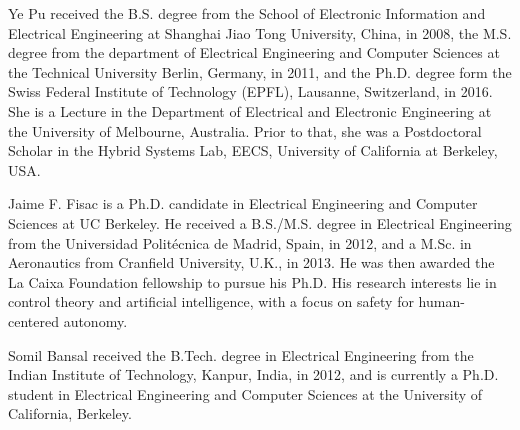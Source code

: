 \documentclass[journal]{IEEEtran}
\begin{document}
\begin{IEEEbiography}{Ye Pu}
	received the B.S. degree from the School of Electronic Information and Electrical Engineering at Shanghai Jiao Tong University, China, in 2008, the M.S. degree from the department of Electrical Engineering and Computer Sciences at the Technical University Berlin, Germany, in 2011, and the Ph.D. degree form the Swiss Federal Institute of Technology (EPFL), Lausanne, Switzerland, in 2016. She is a Lecture in the Department of Electrical and Electronic Engineering at the University of Melbourne, Australia. Prior to that, she was a Postdoctoral Scholar in the Hybrid Systems Lab, EECS, University of California at Berkeley, USA.\vspace{-2cm}
\end{IEEEbiography}
\begin{IEEEbiography}{Jaime F. Fisac}
	is a Ph.D. candidate in Electrical Engineering and Computer Sciences at UC Berkeley. He received a B.S./M.S. degree in Electrical Engineering from the Universidad Politécnica de Madrid, Spain, in 2012, and a M.Sc. in Aeronautics from Cranfield University, U.K., in 2013. He was then awarded the La Caixa Foundation fellowship to pursue his Ph.D. His research interests lie in control theory and artificial intelligence, with a focus on safety for human-centered autonomy.\vspace{-2cm}
\end{IEEEbiography}
\begin{IEEEbiography}{Somil Bansal}
	received the B.Tech. degree in Electrical Engineering from the Indian Institute of Technology, Kanpur, India, in 2012, and is currently a Ph.D. student in Electrical Engineering and Computer Sciences at the University of California, Berkeley.\vspace{-2cm}
\end{IEEEbiography}
\end{document}

